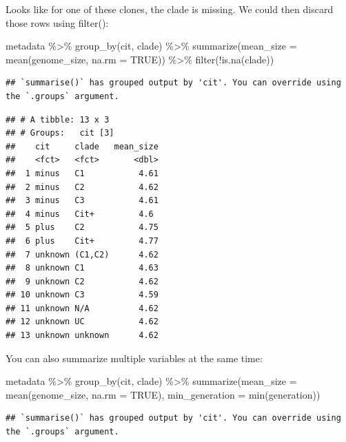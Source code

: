 \documentclass[
]{book}
\newenvironment{Shaded}{\begin{snugshade}}{\end{snugshade}}
\newcommand{\AttributeTok}[1]{\textcolor[rgb]{0.77,0.63,0.00}{#1}}
\newcommand{\ConstantTok}[1]{\textcolor[rgb]{0.00,0.00,0.00}{#1}}
\newcommand{\FunctionTok}[1]{\textcolor[rgb]{0.00,0.00,0.00}{#1}}
\newcommand{\NormalTok}[1]{#1}
\newcommand{\SpecialCharTok}[1]{\textcolor[rgb]{0.00,0.00,0.00}{#1}}
\begin{document}
Looks like for one of these clones, the clade is missing. We could then discard those rows using filter():

\begin{Shaded}
\begin{Highlighting}[]
\NormalTok{metadata }\SpecialCharTok{\%\textgreater{}\%}
  \FunctionTok{group\_by}\NormalTok{(cit, clade) }\SpecialCharTok{\%\textgreater{}\%}
  \FunctionTok{summarize}\NormalTok{(}\AttributeTok{mean\_size =} \FunctionTok{mean}\NormalTok{(genome\_size, }\AttributeTok{na.rm =} \ConstantTok{TRUE}\NormalTok{)) }\SpecialCharTok{\%\textgreater{}\%}
  \FunctionTok{filter}\NormalTok{(}\SpecialCharTok{!}\FunctionTok{is.na}\NormalTok{(clade))}
\end{Highlighting}
\end{Shaded}

\begin{verbatim}
## `summarise()` has grouped output by 'cit'. You can override using the `.groups` argument.
\end{verbatim}

\begin{verbatim}
## # A tibble: 13 x 3
## # Groups:   cit [3]
##    cit     clade   mean_size
##    <fct>   <fct>       <dbl>
##  1 minus   C1           4.61
##  2 minus   C2           4.62
##  3 minus   C3           4.61
##  4 minus   Cit+         4.6 
##  5 plus    C2           4.75
##  6 plus    Cit+         4.77
##  7 unknown (C1,C2)      4.62
##  8 unknown C1           4.63
##  9 unknown C2           4.62
## 10 unknown C3           4.59
## 11 unknown N/A          4.62
## 12 unknown UC           4.62
## 13 unknown unknown      4.62
\end{verbatim}

You can also summarize multiple variables at the same time:

\begin{Shaded}
\begin{Highlighting}[]
\NormalTok{metadata }\SpecialCharTok{\%\textgreater{}\%}
  \FunctionTok{group\_by}\NormalTok{(cit, clade) }\SpecialCharTok{\%\textgreater{}\%}
  \FunctionTok{summarize}\NormalTok{(}\AttributeTok{mean\_size =} \FunctionTok{mean}\NormalTok{(genome\_size, }\AttributeTok{na.rm =} \ConstantTok{TRUE}\NormalTok{),}
            \AttributeTok{min\_generation =} \FunctionTok{min}\NormalTok{(generation))}
\end{Highlighting}
\end{Shaded}

\begin{verbatim}
## `summarise()` has grouped output by 'cit'. You can override using the `.groups` argument.
\end{verbatim}
\end{document}
